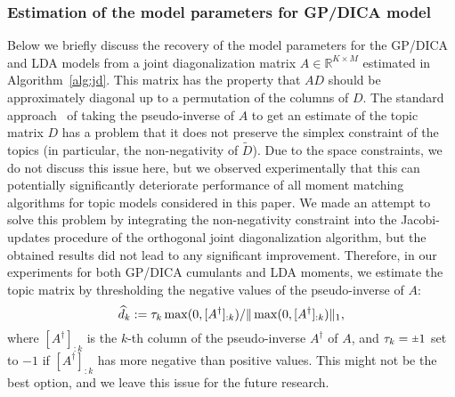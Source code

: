 \documentclass{article}
\def\max{\mathop{\rm max}\limits}
\newcommand{\normp}[1]{\|#1\|}
\newcommand{\wt}[1]{\widetilde{#1}}
\newcommand{\wh}[1]{\widehat{#1}}
\newcommand{\rr}[1]{\mathbb{R}^{#1}}
\newcommand{\pinv}{^{\dagger}}
\newcommand{\rpm}{\raisebox{.2ex}{$\scriptstyle\pm$}}
\begin{document}
\subsubsection{Estimation of the model parameters for GP/DICA model} \label{estimation-model-parameters}
Below we briefly discuss the recovery of the model parameters for the GP/DICA and LDA models from 
a joint diagonalization matrix $A \in \rr{K \times M}$ estimated in Algorithm~\ref{alg:jd}. This matrix has the property that $A D$ should be approximately diagonal up to a permutation of the columns of $D$. The standard approach~\cite{AnaEtAl2012} of taking the pseudo-inverse of $A$ to get an estimate of the topic matrix $D$ has a problem that it does not preserve the simplex constraint of the topics (in particular, the non-negativity of $\wt{D}$). Due to the space constraints, we do not discuss this issue here, but we observed experimentally that this can potentially significantly deteriorate performance of all moment matching algorithms for topic models considered in this paper. We made an attempt to solve this problem by integrating the non-negativity constraint into the Jacobi-updates procedure of the orthogonal joint diagonalization algorithm, but the obtained results did not lead to any significant improvement. Therefore, in our experiments for both GP/DICA cumulants and LDA moments, we estimate the topic matrix by thresholding the negative values of the pseudo-inverse of $A$: 
$$
\wh{d}_k := \tau_k\max(0,[A\pinv]_{:k})/\normp{\max(0,[A\pinv]_{:k})}_1,
$$ 
where $[A\pinv]_{:k}$ is the $k$-th column of the pseudo-inverse $A\pinv$ of $A$, and $\tau_k=\rpm 1$ set to $-1$ if $[A\pinv]_{:k}$ has more negative than positive values. This might not be the best option, and we leave this issue for the future research.
\end{document}
